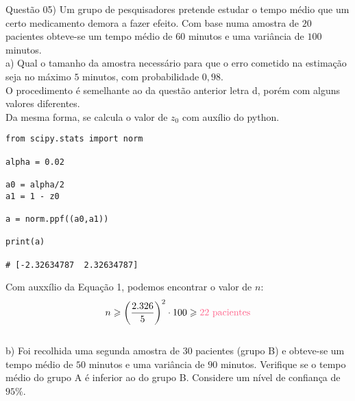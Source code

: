 
\noindent \textcolor{COLOR1}{Questão 05)} Um grupo de pesquisadores pretende estudar o tempo médio que um certo medicamento demora a fazer efeito. Com base numa amostra de $20$ pacientes obteve-se um tempo médio de $60$ minutos e uma variância de $100$ minutos.
\\

a) Qual o tamanho da amostra necessário para que o erro cometido na estimação seja no máximo $5$ minutos, com probabilidade $0,98$.
\\

O procedimento é semelhante ao da questão anterior letra d, porém com alguns valores diferentes.\\

Da mesma forma, se calcula o valor de $z_0$ com auxílio do python.\\

\begin{lstlisting}
from scipy.stats import norm
        
alpha = 0.02
                
a0 = alpha/2
a1 = 1 - z0
        
a = norm.ppf((a0,a1))
                
print(a)
        
# [-2.32634787  2.32634787]
\end{lstlisting}

Com auxxílio da Equação 1, podemos encontrar o valor de $n$:
\\

\[
    n\geqslant \biggl(\frac{2.326}{5}\biggr)^2 \cdot 100 \geqslant \textcolor{COLOR2}{22\ \text{pacientes}}
\]
\\

b) Foi recolhida uma segunda amostra de $30$ pacientes (grupo B) e obteve-se um tempo médio de $50$ minutos e uma variância de $90$ minutos. Verifique se o tempo médio do grupo A é inferior ao do grupo B. Considere um nível de confiança de $95\%$.
